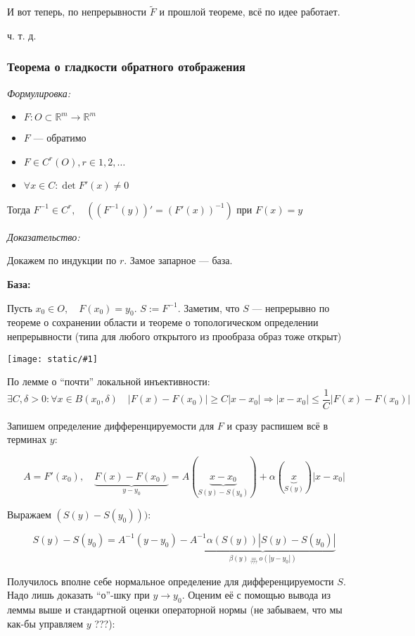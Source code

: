 \documentclass{article}
\def\image#1{\texttt{[image: static/\#1]}}
\begin{document}
И вот теперь, по непрерывности $\widetilde{F}$ и прошлой теореме, всё по идее работает.

ч. т. д.

\subsubsection{Теорема о гладкости обратного отображения}
\textit{Формулировка:}

\begin{itemize}
    \item $F: O \subset \mathbb{R}^m \rightarrow \mathbb{R}^m$
    \item $F$ --- обратимо
    \item $F \in C^r(O), r \in 1, 2, \ldots$
    \item $\forall x \in C: \det F'(x) \neq 0$
\end{itemize}

Тогда $F^{-1} \in C^r, \quad ((F^{-1}(y))' = (F'(x))^{-1})$ при $F(x) = y$

\textit{Доказательство:}

Докажем по индукции по $r$. Замое запарное --- база.

\textbf{База:}

Пусть $x_0 \in O, \quad F(x_0) = y_0$. $S := F^{-1}$. Заметим, что $S$ --- непрерывно по теореме о сохранении области и теореме о топологическом определении непрерывности (типа для любого открытого из прообраза образ тоже открыт)

\image{glad_obr.png}

По лемме о ``почти'' локальной инъективности:
\[\exists C, \delta > 0: \forall x \in B(x_0, \delta) \quad |F(x) - F(x_0)| \ge C|x - x_0| \Rightarrow |x - x_0| \le \frac{1}{C}|F(x) - F(x_0)|\]

Запишем определение дифференцируемости для $F$ и сразу распишем всё в терминах $y$:

\[A = F'(x_0), \quad \underbrace{F(x) - F(x_0)}_{y - y_0} = A(\underbrace{x - x_0}_{S(y) - S(y_0)}) + \alpha(\underbrace{x}_{S(y)})|x - x_0|\]

Выражаем $(S(y) - S(y_0)))$:

\[S(y) - S(y_0) = A^{-1}(y - y_0) - \underbrace{A^{-1}\alpha(S(y))|S(y) - S(y_0)|}_{\beta(y) \underset{???}{=} o(|y - y_0|)}\]

Получилось вполне себе нормальное определение для дифференцируемости $S$. Надо лишь доказать ``о''-шку при $y \rightarrow y_0$. Оценим её с помощью вывода из леммы выше и стандартной оценки операторной нормы (не забываем, что мы как-бы управляем $y$ ???):
\end{document}
